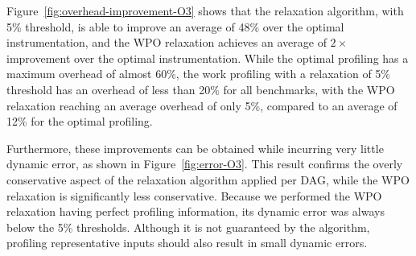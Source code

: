 Figure~\ref{fig:overhead-improvement-O3} shows that the relaxation algorithm, with 5\% threshold, is able to improve an average of 48\% over the optimal instrumentation, 
and the WPO relaxation achieves an average of $2\times$ improvement over the optimal instrumentation.
While the optimal profiling has a maximum overhead of almost 60\%, the work profiling with a relaxation of 5\% threshold has an overhead of less than 20\% for all benchmarks,
with the WPO relaxation reaching an average overhead of only 5\%, compared to an average of 12\% for the optimal profiling.

Furthermore, these improvements can be obtained while incurring very little dynamic error, as shown in Figure~\ref{fig:error-O3}.
This result confirms the overly conservative aspect of the relaxation algorithm applied per DAG,
while the WPO relaxation is significantly less conservative.
Because we performed the WPO relaxation having perfect profiling information, its dynamic error was always below the 5\% thresholds.
Although it is not guaranteed by the algorithm, profiling representative inputs should also result in small dynamic errors.



%




